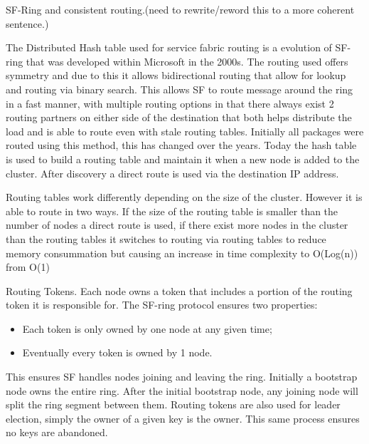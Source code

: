 \documentclass[a4paper,10pt,titlepage]{report}
\begin{document}
    SF-Ring and consistent routing.(need to rewrite/reword this to a more coherent sentence.)

    The Distributed Hash table used for service fabric routing is a evolution of SF-ring that was developed within Microsoft in the 2000s. The routing used offers symmetry and due to this it allows bidirectional routing that allow for lookup and routing via binary search. This allows SF to route message around the ring in a fast manner, with multiple routing options in that there always exist 2 routing partners on either side of the destination that both helps distribute the load and is able to route even with stale routing tables. Initially all packages were routed using this method, this has changed over the years. Today the hash table is used to build a routing table and maintain it when a new node is added to the cluster. After discovery a direct route is used via the destination IP address. \\
    \vspace{5mm}

    Routing tables work differently depending on the size of the cluster. However it is able to route in two ways. If the size of the routing table is smaller than the number of nodes a direct route is used, if there exist more nodes in the cluster than the routing tables it switches to routing via routing tables to reduce memory consummation but causing an increase in time complexity to O(Log(n)) from O(1)\\
    \vspace{5mm}

    Routing Tokens.
    Each node owns a token that includes a portion of the routing token it is responsible for. The SF-ring protocol ensures two properties:
    \begin{itemize}
        \item Each token is only owned by one node at any given time;
        \item Eventually every token is owned by 1 node.
    \end{itemize}
    This ensures SF handles nodes joining and leaving the ring. Initially a bootstrap node owns the entire ring. After the initial bootstrap node, any joining node will split the ring segment between them. Routing tokens are also used for leader election, simply the owner of a given key is the owner. This same process ensures no keys are abandoned.
\end{document}
